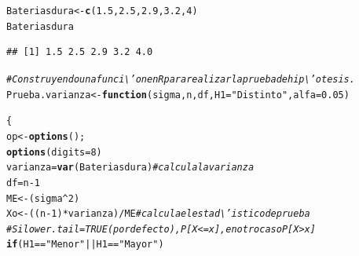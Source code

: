 \documentclass[12pt,letterpaper]{article}\usepackage[]{graphicx}\usepackage[]{color}
\makeatletter
\newcommand{\hlnum}[1]{\textcolor[rgb]{0.686,0.059,0.569}{#1}}%
\newcommand{\hlstr}[1]{\textcolor[rgb]{0.192,0.494,0.8}{#1}}%
\newcommand{\hlcom}[1]{\textcolor[rgb]{0.678,0.584,0.686}{\textit{#1}}}%
\newcommand{\hlopt}[1]{\textcolor[rgb]{0,0,0}{#1}}%
\newcommand{\hlstd}[1]{\textcolor[rgb]{0.345,0.345,0.345}{#1}}%
\newcommand{\hlkwa}[1]{\textcolor[rgb]{0.161,0.373,0.58}{\textbf{#1}}}%
\newcommand{\hlkwb}[1]{\textcolor[rgb]{0.69,0.353,0.396}{#1}}%
\newcommand{\hlkwc}[1]{\textcolor[rgb]{0.333,0.667,0.333}{#1}}%
\newcommand{\hlkwd}[1]{\textcolor[rgb]{0.737,0.353,0.396}{\textbf{#1}}}%
\newenvironment{kframe}{%
 \def\at@end@of@kframe{}%
 \ifinner\ifhmode%
  \def\at@end@of@kframe{\end{minipage}}%
  \begin{minipage}{\columnwidth}%
 \fi\fi%
 \def\FrameCommand##1{\hskip\@totalleftmargin \hskip-\fboxsep
 \colorbox{shadecolor}{##1}\hskip-\fboxsep
     \hskip-\linewidth \hskip-\@totalleftmargin \hskip\columnwidth}%
 \MakeFramed {\advance\hsize-\width
   \@totalleftmargin\z@ \linewidth\hsize
   \@setminipage}}%
 {\par\unskip\endMakeFramed%
 \at@end@of@kframe}
\newenvironment{knitrout}{}{} %
\makeatother
\begin{document}
\begin{knitrout}
\color{fgcolor}\begin{kframe}
\begin{alltt}
\hlstd{Bateriasdura} \hlkwb{<-} \hlkwd{c}\hlstd{(}\hlnum{1.5}\hlstd{,} \hlnum{2.5}\hlstd{,} \hlnum{2.9}\hlstd{,} \hlnum{3.2}\hlstd{,} \hlnum{4}\hlstd{)}
\hlstd{Bateriasdura}
\end{alltt}
\begin{verbatim}
## [1] 1.5 2.5 2.9 3.2 4.0
\end{verbatim}
\begin{alltt}
\hlcom{# Construyendo una funci\textbackslash{}'on en R para realizar la prueba de hip\textbackslash{}'otesis.}
\hlstd{Prueba.varianza} \hlkwb{<-} \hlkwa{function}\hlstd{(}\hlkwc{sigma}\hlstd{,} \hlkwc{n}\hlstd{,} \hlkwc{df}\hlstd{,} \hlkwc{H1}\hlstd{=}\hlstr{"Distinto"}\hlstd{,} \hlkwc{alfa}\hlstd{=}\hlnum{0.05}\hlstd{)}

\hlstd{\{}
\hlstd{op} \hlkwb{<-} \hlkwd{options}\hlstd{();}
\hlkwd{options}\hlstd{(}\hlkwc{digits}\hlstd{=}\hlnum{8}\hlstd{)}
\hlstd{varianza}\hlkwb{=}\hlkwd{var}\hlstd{(Bateriasdura)} \hlcom{#calcula la varianza}
\hlstd{df}\hlkwb{=}\hlstd{n}\hlopt{-}\hlnum{1}
\hlstd{ME} \hlkwb{<-} \hlstd{(sigma}\hlopt{^}\hlnum{2}\hlstd{)}
\hlstd{Xo} \hlkwb{<-} \hlstd{((n}\hlopt{-}\hlnum{1}\hlstd{)}\hlopt{*}\hlstd{varianza)}\hlopt{/}\hlstd{ME} \hlcom{#calcula el estad\textbackslash{}'istico de prueba }
\hlcom{# Si lower.tail = TRUE (por defecto), P[X <= x], en otro caso P[X > x] }
\hlkwa{if} \hlstd{(H1} \hlopt{==} \hlstr{"Menor"} \hlopt{||} \hlstd{H1} \hlopt{==} \hlstr{"Mayor"}\hlstd{)}


\end{alltt}
\end{kframe}
\end{knitrout}
\end{document}

